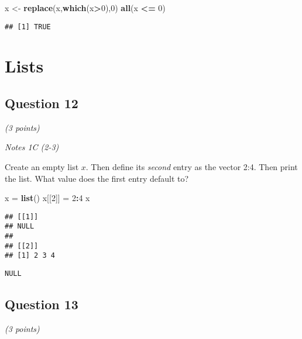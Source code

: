 \documentclass[
]{article}
\newenvironment{Shaded}{\begin{snugshade}}{\end{snugshade}}
\newcommand{\DecValTok}[1]{\textcolor[rgb]{0.00,0.00,0.81}{#1}}
\newcommand{\KeywordTok}[1]{\textcolor[rgb]{0.13,0.29,0.53}{\textbf{#1}}}
\newcommand{\NormalTok}[1]{#1}
\newcommand{\OperatorTok}[1]{\textcolor[rgb]{0.81,0.36,0.00}{\textbf{#1}}}
\newcommand{\StringTok}[1]{\textcolor[rgb]{0.31,0.60,0.02}{#1}}
\begin{document}
\begin{Shaded}
\begin{Highlighting}[]
\NormalTok{x <-}\StringTok{ }\KeywordTok{replace}\NormalTok{(x,}\KeywordTok{which}\NormalTok{(x}\OperatorTok{>}\DecValTok{0}\NormalTok{),}\DecValTok{0}\NormalTok{)}
\KeywordTok{all}\NormalTok{(x }\OperatorTok{<=}\StringTok{ }\DecValTok{0}\NormalTok{)}
\end{Highlighting}
\end{Shaded}

\begin{verbatim}
## [1] TRUE
\end{verbatim}

\hypertarget{lists}{%
\section{Lists}\label{lists}}

\hypertarget{question-12}{%
\subsection{Question 12}\label{question-12}}

\emph{(3 points)}

\emph{Notes 1C (2-3)}

Create an empty list \(x\). Then define its \emph{second} entry as the
vector 2:4. Then print the list. What value does the first entry default
to?

\begin{Shaded}
\begin{Highlighting}[]
\NormalTok{x =}\StringTok{ }\KeywordTok{list}\NormalTok{()}
\NormalTok{x[[}\DecValTok{2}\NormalTok{]] =}\StringTok{ }\DecValTok{2}\OperatorTok{:}\DecValTok{4}
\NormalTok{x}
\end{Highlighting}
\end{Shaded}

\begin{verbatim}
## [[1]]
## NULL
## 
## [[2]]
## [1] 2 3 4
\end{verbatim}

\begin{verbatim}
NULL
\end{verbatim}

\hypertarget{question-13}{%
\subsection{Question 13}\label{question-13}}

\emph{(3 points)}
\end{document}

